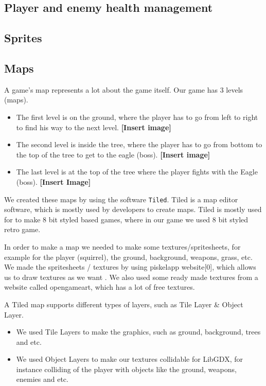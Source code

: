 \documentclass[12p]{article}
\begin{document}

\subsection{Player and enemy health management} \label{DocPlayerAndHealthManagement}


\subsection{Sprites} \label{DocSprites}


\subsection{Maps} \label{DocMaps}
A game's map represents a lot about the game itself. Our game has 3 levels (maps).

\begin{itemize}
 \item The first level is on the ground, where the player has to go from left to right to find his way to the next level. \textbf{[Insert image]}
 \item The second level is inside the tree, where the player has to go from bottom to the top of the tree to get to the eagle (boss). \textbf{[Insert image]}
 \item The last level is at the top of the tree where the player fights with the Eagle (boss). \textbf{[Insert Image]}
\end{itemize}

We created these maps by using the software \texttt{Tiled}. Tiled is a map editor software, which is mostly used by developers to create maps. Tiled is mostly used for to make 8 bit styled based games, where in our game we used 8 bit styled retro game.

In order to make a map we needed to make some textures/spritesheets, for example for the player (squirrel), the ground, background, weapons, grass, etc. We made the spritesheets / textures by using piskelapp website[0], which allows us to draw textures as we want . We also used some ready made textures from a website called opengameart, which has a lot of free textures.

A Tiled map supports different types of layers, such as Tile Layer \& Object Layer. 
\begin{itemize}
\item We used Tile Layers to make the graphics, such as ground, background, trees and etc.
\item We used Object Layers to make our textures collidable for LibGDX, for instance colliding of the player with objects like the ground, weapons, enemies and etc.
\end{itemize}
\end{document}
